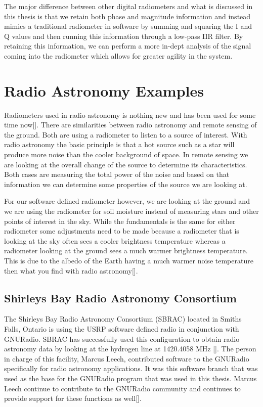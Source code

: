The major difference between other digital radiometers and what is discussed in this thesis is that we retain both phase and magnitude information and instead mimics a traditional radiometer in software by summing and squaring the I and Q values and then running this information through a low-pass IIR filter.  By retaining this information, we can perform a more in-dept analysis of the signal coming into the radiometer which allows for greater agility in the system.

\section{Radio Astronomy Examples}
Radiometers used in radio astronomy is nothing new and has been used for some time now[\cite{Ohm}]. There are similarities between radio astronomy and remote sensing of the ground.  Both are using a radiometer to listen to a source of interest.  With radio astronomy the basic principle is that a hot source such as a star will produce more noise than the cooler background of space.  In remote sensing we are looking at the overall change of the source to determine its characteristics.  Both cases are measuring the total power of the noise and based on that information we can determine some properties of the source we are looking at.

For our software defined radiometer however, we are looking at the ground and we are using the radiometer for soil moisture instead of measuring stars and other points of interest in the sky.  While the fundamentals is the same for either radiometer some adjustments need to be made because a radiometer that is looking at the sky often sees a cooler brightness temperature whereas a radiometer looking at the ground sees a much warmer brightness temperature.  This is due to the albedo of the Earth having a much warmer noise temperature then what you find with radio astronomy[\cite{Tiuri}].

\subsection{Shirleys Bay Radio Astronomy Consortium}
The Shirleys Bay Radio Astronomy Consortium (SBRAC) located in Smiths Falls, Ontario is using the USRP software defined radio in conjunction with GNURadio.  SBRAC has successfully used this configuration to obtain radio astronomy data by looking at the hydrogen line at 1420.4058 MHz [\cite{Leech2007}].  The person in charge of this facility, Marcus Leech, contributed software to the GNURadio specifically for radio astronomy applications.  It was this software branch that was used as the base for the GNURadio program that was used in this thesis.  Marcus Leech continue to contribute to the GNURadio community and continues to provide support for these functions as well[\cite{Leech}].

